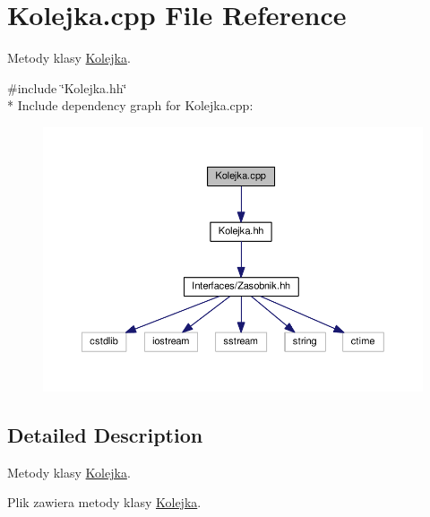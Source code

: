 \hypertarget{a00039}{}\section{Kolejka.\+cpp File Reference}
\label{a00039}


Metody klasy \hyperlink{a00011}{Kolejka}.  


{\ttfamily \#include \char`\"{}Kolejka.\+hh\char`\"{}}\\*
Include dependency graph for Kolejka.\+cpp\+:
\nopagebreak
\begin{figure}[H]
\begin{center}
\leavevmode
\includegraphics[width=350pt]{a00084}
\end{center}
\end{figure}


\subsection{Detailed Description}
Metody klasy \hyperlink{a00011}{Kolejka}. 

Plik zawiera metody klasy \hyperlink{a00011}{Kolejka}. 